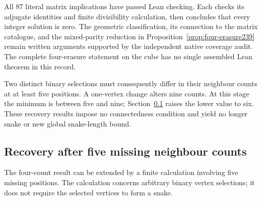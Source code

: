 \documentclass[11pt,a4paper]{article}
\theoremstyle{definition}
\theoremstyle{remark}
\begin{document}
All 87 literal matrix implications have passed Lean checking. Each
checks its adjugate identities and finite divisibility calculation,
then concludes that every integer solution is zero. The geometric
classification, its connection to the matrix catalogue, and the
mixed-parity reduction in Proposition~\ref{prop:four-erasure239} remain
written arguments supported by the independent native coverage audit.
The complete four-erasure statement on the cube has no single assembled
Lean theorem in this record.

Two distinct binary selections must consequently differ in their
neighbour counts at at least five positions. A one-vertex change alters
nine counts. At this stage the minimum is between five and nine;
Section~\ref{sec:five-erasure240} raises the lower value to six. These
recovery results impose no connectedness condition and yield no longer
snake or new global snake-length bound.

\subsection{Recovery after five missing neighbour counts}
\label{sec:five-erasure240}
The four-count result can be extended by a finite calculation involving
five missing positions. The calculation concerns arbitrary binary vertex
selections; it does not require the selected vertices to form a snake.
\end{document}
